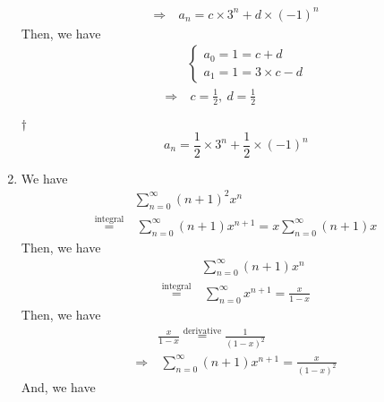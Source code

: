 \documentclass[a4paper,12pt]{article}
\begin{document}
\begin{enumerate}
\begin{equation}
\begin{aligned}
            \Rightarrow & \ a_n = c \times 3^n + d \times (-1)^n
        \end{aligned}
    \end{equation} Then, we have \begin{equation}
        \begin{aligned}
            & \begin{cases}
                a_0 = 1 = c + d \\
                a_1 = 1 = 3 \times c - d
            \end{cases} \\
            \Rightarrow & \ c = \frac{1}{2}, \ d = \frac{1}{2}
        \end{aligned}
    \end{equation}
    \begin{answer}{$\dag$}\begin{equation}
            a_n = \frac{1}{2} \times 3^n + \frac{1}{2} \times (-1)^n    
        \end{equation}
    \end{answer}
    \item We have \begin{equation}
        \begin{aligned}
            & \sum_{n = 0}^{\infty}(n + 1)^2 x^n \\
            \overset{\text{integral}}= & \ \sum_{n = 0}^{\infty}(n + 1)x^{n + 1} = x\sum_{n = 0}^{\infty}(n + 1)x^{}
        \end{aligned}
    \end{equation} Then, we have \begin{equation}
        \begin{aligned}
            & \sum_{n = 0}^{\infty}(n + 1)x^{n} \\
            \overset{\text{integral}}= & \ \sum_{n = 0}^{\infty}x^{n + 1} = \frac{x}{1 - x}
        \end{aligned}
    \end{equation} Then, we have \begin{equation}
        \begin{aligned}
            & \frac{x}{1 - x} \overset{\text{derivative}}= \frac{1}{(1 - x)^2} \\
            \Rightarrow & \ \sum_{n = 0}^{\infty}(n + 1)x^{n + 1} = \frac{x}{(1 - x)^2}
        \end{aligned}
    \end{equation} And, we have \begin{equation}
        \begin{aligned}

\end{aligned}
\end{equation}
\end{enumerate}
\end{document}
